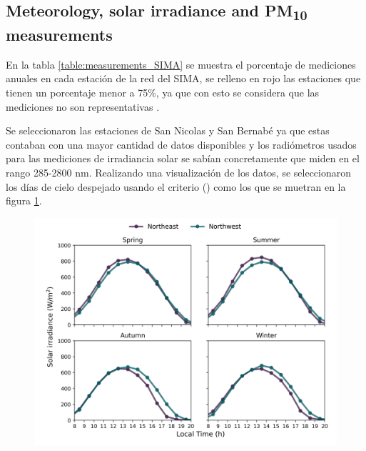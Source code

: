 \subsection{Meteorology, solar irradiance and PM\textsubscript{10} measurements}
En la tabla \ref{table:measurements_SIMA} se muestra el porcentaje de mediciones anuales en cada estación de la red del SIMA, se relleno en rojo las estaciones que tienen un porcentaje menor a 75\%, ya que con esto se considera que las mediciones no son representativas \cite{molina2019}.

Se seleccionaron las estaciones de San Nicolas y San Bernabé ya que estas contaban con una mayor cantidad de datos disponibles y los radiómetros usados para las mediciones de irradiancia solar se sabían concretamente que miden en el rango 285-2800 nm. Realizando una visualización de los datos, se seleccionaron los días de cielo despejado usando el criterio () como los que se muetran en la figura \ref{fig:clear_days}.
\begin{figure}[H]
    \centering
    \includegraphics[scale=0.5]{images/Clear_days.png}
    \caption{}
    \label{fig:clear_days}
\end{figure}